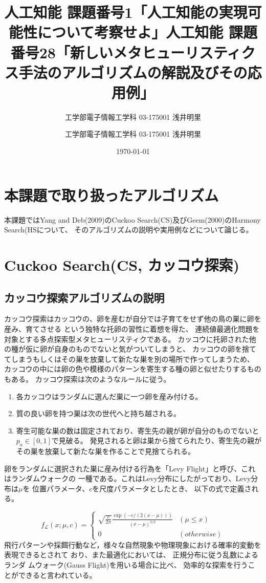 \documentclass[uplatex]{jsarticle}
\title{人工知能 課題番号1「人工知能の実現可能性について考察せよ」}
\author{工学部電子情報工学科 03-175001 浅井明里}
\title{人工知能 課題番号28「新しいメタヒューリスティクス手法のアルゴリズムの解説及びその応用例」}
\author{工学部電子情報工学科 03-175001 浅井明里}
\date{\today}
\makeatletter
\def\maketitle{%
  \null
  \thispagestyle{empty}%
  \vfill
  \begin{center}\leavevmode
    \normalfont
    {\LARGE \@title\par}%
    \vskip 1cm
    {\Large \@author\par}%
    \vskip 1cm
    {\Large \@date\par}%
  \end{center}%
  \vfill
  \null
  \@thanks%
  \cleardoublepage
  }
\makeatother
\begin{document}
\maketitle

\section{本課題で取り扱ったアルゴリズム}
本課題ではYang and Deb(2009)のCuckoo Search(CS)及びGeem(2000)のHarmony Search(HSについて、
そのアルゴリズムの説明や実用例などについて論じる。

\section{Cuckoo Search(CS, カッコウ探索)}
\subsection{カッコウ探索アルゴリズムの説明}
カッコウ探索はカッコウの、卵を産むが自分では子育てをせず他の鳥の巣に卵を産み、育てさせる
という独特な托卵の習性に着想を得た、
連続値最適化問題を対象とする多点探索型メタヒューリスティクである。
カッコウに托卵された他の種が仮に卵が自身のものでないと気がついてしまうと、
カッコウの卵を捨ててしまうもしくはその巣を放棄して新たな巣を別の場所で作ってしまうため、
カッコウの中には卵の色や模様のパターンを寄生する種の卵と似せたりするものもある。
カッコウ探索は次のようなルールに従う。

\begin{enumerate}
  \item 各カッコウはランダムに選んだ巣に一つ卵を産み付ける。
  \item 質の良い卵を持つ巣は次の世代へと持ち越される。
  \item 寄生可能な巣の数は固定されており、寄生先の親が卵が自分のものでないと$p_a \in [0,1]$で見破る。
  発見されると卵は巣から捨てられたり、寄生先の親がその巣を放棄して新たな巣を作ることで見捨てられる。
\end{enumerate}

卵をランダムに選択された巣に産み付ける行為を「Levy Flight」と呼び、これはランダムウォークの
一種である。これはLevy分布にしたがっており、Levy分布は$\mu$を
位置パラメータ、$c$を尺度パラメータとしたとき、
以下の式で定義される。

\[
  f_\mathcal{L}(x; \mu, c) = \begin{cases}
    \sqrt{\frac{c}{2\pi}}\frac{\exp{(-c/(2(x-\mu)))}}{(x-\mu)^{3/2}} & (\mu \leq x) \\
    0 & (otherwise)
  \end{cases}
\]
飛行パターンや採餌行動など，様々な自然現象や物理現象における確率的変動を表現できるとされて
おり、また最適化においては、
正規分布に従う乱数によるランダ ムウォーク(Gauss Flight)を用いる場合に比べ、
効率的な探索を行うことができると言われている。
\end{document}
